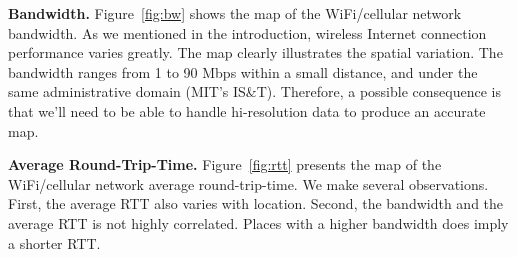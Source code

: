 {\bfseries Bandwidth.}
Figure~\ref{fig:bw} shows the map of the WiFi/cellular network bandwidth.
As we mentioned in the introduction, wireless Internet connection performance 
varies greatly. The map clearly illustrates the spatial variation. The bandwidth
ranges from 1 to 90 Mbps within a small distance, and under the same administrative
domain (MIT's IS\&T). Therefore, a possible consequence is that we'll need to 
be able to handle hi-resolution data to produce an accurate map.

{\bfseries Average Round-Trip-Time.}
Figure~\ref{fig:rtt} presents the map of the WiFi/cellular network average
round-trip-time. We make several observations. First, the average RTT also 
varies with location. Second, the bandwidth and the average RTT is not highly 
correlated. Places with a higher bandwidth does imply a shorter RTT.


